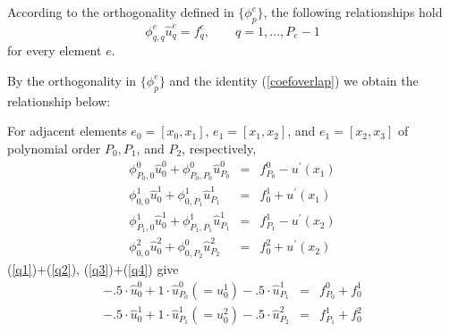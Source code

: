 According to the orthogonality defined in $\{\phi_p^e\}$, the following relationships hold
\begin{equation}
\label{q0}\phi_{q,q}^e \hat u_q^e = f_q^e, \qquad q = 1, \ldots, P_e-1
\end{equation}
for every element $e$.

By the orthogonality in $\{\phi_p^e\}$ and the identity (\ref{coefoverlap}) we obtain the relationship below:

For adjacent elements $e_0=[x_0, x_1]$, $e_1=[x_1, x_2]$, and $e_1=[x_2, x_3]$ of polynomial order $P_0, P_1$, and $P_2$, respectively,
\begin{eqnarray}
\label{q1}  \phi_{P_0, 0}^0\hat u_0^0 + \phi_{P_0, P_0}^0 \hat u_{P_0}^0 &=& f_{P_0}^0 - u^{\prime}(x_1) \\
\label{q2}  \phi_{0, 0}^1\hat u_0^1 + \phi_{0, P_1}^1 \hat u_{P_1}^1     &=& f_{0}^1 + u^{\prime}(x_1) \\
\label{q3}  \phi_{P_1, 0}^1\hat u_0^1 + \phi_{P_1, P_1}^1 \hat u_{P_1}^1 &=& f_{P_1}^1 - u^{\prime}(x_2) \\
\label{q4}  \phi_{0, 0}^2\hat u_0^2 + \phi_{0, P_2}^0 \hat u_{P_2}^2     &=& f_{0}^2 + u^{\prime}(x_2)
\end{eqnarray}
(\ref{q1})$+$(\ref{q2}), (\ref{q3})$+$(\ref{q4}) give
\begin{eqnarray}
\label{q5}  -.5 \cdot \hat u_0^0 + 1 \cdot \hat u_{P_0}^0(=u_0^1) -.5 \cdot \hat u_{P_1}^1 &=& f_{P_0}^0 + f_{0}^1 \\
\label{q6}  -.5 \cdot \hat u_0^1 + 1 \cdot \hat u_{P_1}^1(=u_0^2) -.5 \cdot \hat u_{P_2}^2 &=& f_{P_1}^1 + f_{0}^2
\end{eqnarray}

